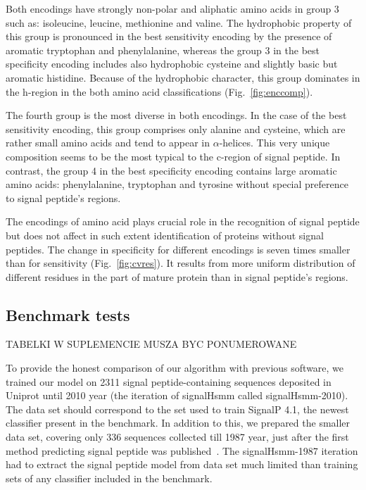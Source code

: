 \documentclass[10pt,letterpaper]{article}
\begin{document}
Both encodings have strongly non-polar and aliphatic amino acids in group 3 such as: isoleucine, leucine, methionine and valine. The hydrophobic property of this group is  pronounced in the best sensitivity encoding by the presence of aromatic tryptophan and phenylalanine, whereas the group 3 in the best specificity encoding includes also hydrophobic cysteine and slightly basic but aromatic histidine. Because of the hydrophobic character, this group dominates in the h-region in the both amino acid classifications (Fig.~\ref{fig:enccomp}).

The fourth group is the most diverse in both encodings. In the case of the best sensitivity encoding, this group comprises only alanine and cysteine, which are rather small amino acids and tend to appear in $\alpha$-helices. This very unique composition seems to be the most typical to the c-region of signal peptide. In contrast, the group 4 in the best specificity encoding contains large aromatic amino acids: phenylalanine, tryptophan and tyrosine without special preference to signal peptide's regions.  

The encodings of amino acid plays crucial role in the recognition of signal peptide but does not affect in such extent identification of proteins without signal peptides. The change in specificity for different encodings is seven times smaller than for sensitivity (Fig.~\ref{fig:cvres}). It results from more uniform distribution of different residues in the part of mature protein than in signal peptide's regions.

\subsection*{Benchmark tests}

TABELKI W SUPLEMENCIE MUSZA BYC PONUMEROWANE

To provide the honest comparison of our algorithm with previous software, we trained our model on 2311 signal peptide-containing sequences deposited in Uniprot until 2010 year (the iteration of signalHsmm called signalHsmm-2010). The data set should correspond to the set used to train SignalP 4.1, the newest classifier present in the benchmark. In addition to this, we prepared the smaller data set, covering only 336 sequences collected till 1987 year, just after the first method predicting signal peptide was published~\cite{1986vonheijnea}. The signalHsmm-1987 iteration had to extract the signal peptide model from data set much limited than training sets of any classifier included in the benchmark.
\end{document}
